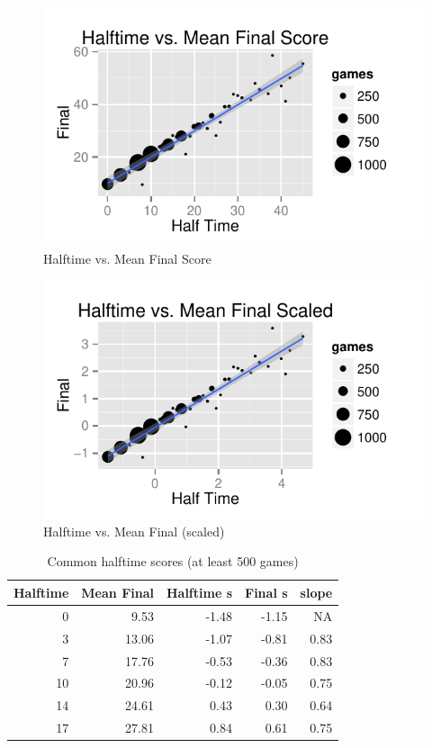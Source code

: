 \documentclass[letterpaper, landscape]{exam}
\begin{document}
  \begin{figure}[H]
    \centering
    \includegraphics{figures/nfl/ht_vs_mean_final.pdf}
    \caption{Halftime vs. Mean Final Score}
  \end{figure}

  \begin{figure}[H]
    \centering
    \includegraphics{figures/nfl/ht_vs_mean_final_scaled.pdf}
    \caption{Halftime vs. Mean Final (scaled)}
  \end{figure}

  \begin{table}[H]
    \centering
    \begin{tabular}{rrrrr}
      \toprule
      Halftime & Mean Final & Halftime s & Final s & slope\\
      \midrule
      0        & 9.53       & -1.48      & -1.15   & NA \\
      3        & 13.06      & -1.07      & -0.81   & 0.83 \\
      7        & 17.76      & -0.53      & -0.36   & 0.83 \\
      10       & 20.96      & -0.12      & -0.05   & 0.75 \\
      14       & 24.61      & 0.43       & 0.30    & 0.64 \\
      17       & 27.81      & 0.84       & 0.61    & 0.75 \\
      \bottomrule
    \end{tabular}
    \caption{Common halftime scores (at least 500 games)}
  \end{table}
\end{document}
